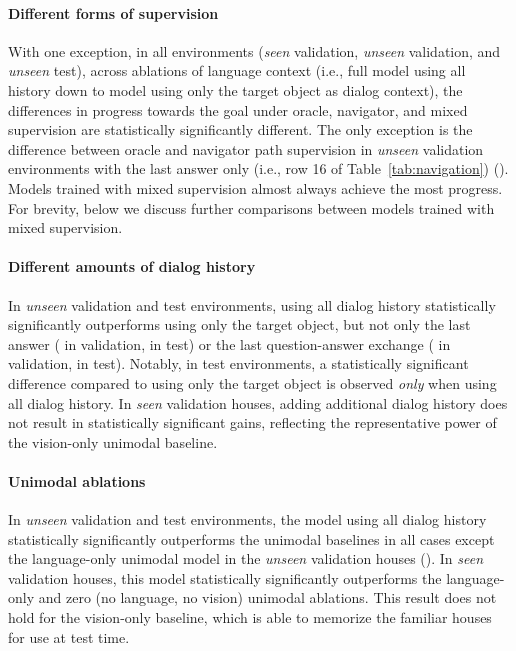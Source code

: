 \documentclass{article}
\begin{document}
\paragraph{Different forms of supervision}
With one exception, in all environments (\emph{seen} validation, \emph{unseen} validation, and \emph{unseen} test), across ablations of language context (i.e., full model using all history down to model using only the target object as dialog context), the differences in progress towards the goal under oracle, navigator, and mixed supervision are statistically significantly different.
The only exception is the difference between oracle and navigator path supervision in \emph{unseen} validation environments with the last answer only (i.e., row 16 of Table~\ref{tab:navigation}) ().
Models trained with mixed supervision almost always achieve the most progress. For brevity, below we discuss further comparisons between models trained with mixed supervision.

\paragraph{Different amounts of dialog history}
In \emph{unseen} validation and test environments, using all dialog history statistically significantly outperforms using only the target object, but not only the last answer ( in validation,  in test) or the last question-answer exchange ( in validation,  in test).
Notably, in test environments, a statistically significant difference compared to using only the target object is observed \emph{only} when using all dialog history.
In \emph{seen} validation houses, adding additional dialog history does not result in statistically significant gains, reflecting the representative power of the vision-only unimodal baseline.

\paragraph{Unimodal ablations}
In \emph{unseen} validation and test environments, the model using all dialog history statistically significantly outperforms the unimodal baselines in all cases except the language-only unimodal model in the \emph{unseen} validation houses ().
In \emph{seen} validation houses, this model statistically significantly outperforms the language-only and zero (no language, no vision) unimodal ablations.
This result does not hold for the vision-only baseline, which is able to memorize the familiar houses for use at test time.
\end{document}
